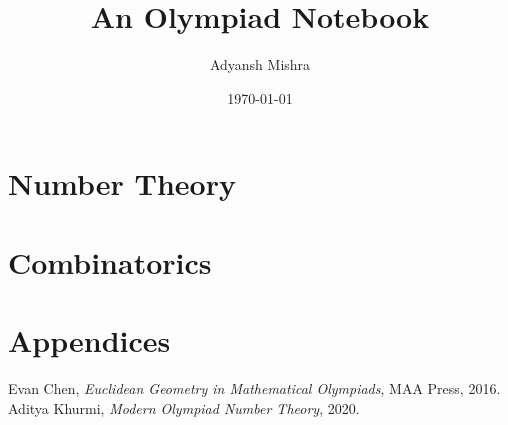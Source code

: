\documentclass[twoside,a4paper,10pt]{memoir}
\author{Adyansh Mishra}
\date{\today}
\title{An Olympiad Notebook}
\begin{document}

    \pagestyle{empty}
    

\frontmatter
    \fncytitle    
    \renewcommand*{\contentsname}{Short contents}
    \setcounter{tocdepth}{0}%
    \tableofcontents
    \clearpage
    \renewcommand*{\contentsname}{Contents}
    \setcounter{tocdepth}{1}%
    \tableofcontents
    
    \clearpage
    \listoffigures
    \restoregeometry
    \pagestyle{mystyle}
    
    


    \mainmatter 
    \part{Number Theory}
    \parttoc
    \restoregeometry
    
  
    
    \part{Combinatorics}
    \parttoc
    \restoregeometry

    \appendix
    \part{Appendices}
    \parttoc
    \restoregeometry
    
    


    \backmatter
    \printindex

    \begin{thebibliography}{5}
          Evan Chen,
          \textit{Euclidean Geometry in Mathematical Olympiads},
          MAA Press,
          2016.
            Aditya Khurmi,
            \emph{Modern Olympiad Number Theory},
            2020.
    \end{thebibliography}
\end{document}
